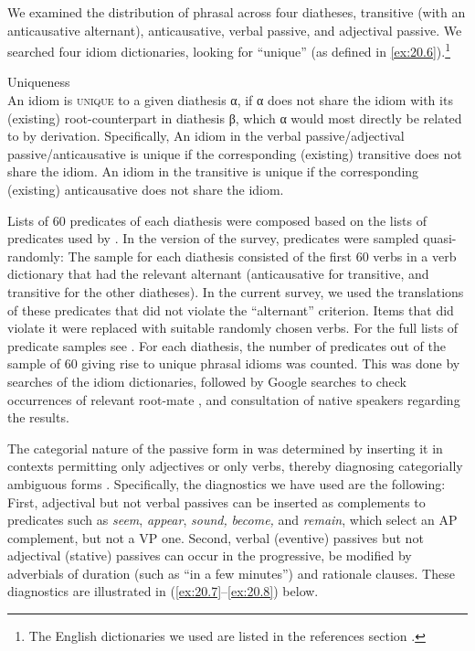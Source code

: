 \documentclass[output=paper]{langsci/langscibook}
\begin{document}
We examined the distribution of phrasal  across four diatheses,
transitive (with an anticausative alternant), anticausative, verbal passive,
and adjectival passive. We searched four  idiom dictionaries,
looking for ``unique''  (as defined in \ref{ex:20.6}).\footnote{The
English dictionaries we used are listed in the references section
\parencite[see][]{Ammer2013,White1998,Heacook2003,Spears2006}.}

\ea\label{ex:20.6} Uniqueness\\
    An idiom is \textsc{unique} to a given diathesis α, if α does not share the idiom
    with its (existing) root-counterpart in diathesis β, which α would most
    directly be related to by derivation.  Specifically,
    \ea An idiom in the verbal passive\slash adjectival passive\slash anticausative is
    unique if the corresponding (existing) transitive does not share the idiom.
    \ex An idiom in the transitive is unique if the corresponding (existing)
    anticausative does not share the idiom.
    \z
\z

Lists of 60 predicates of each diathesis were composed based on the lists of
predicates used by \citet{HorSil2009}. In the  version of
the survey, predicates were sampled quasi-randomly: The sample for each
diathesis consisted of the first 60 verbs in a verb dictionary that had the
relevant alternant (anticausative for transitive, and transitive for the other
diatheses). In the current survey, we used the  translations of
these predicates that did not violate the ``alternant'' criterion. Items that
did violate it were replaced with suitable randomly chosen  verbs. For
the full lists of predicate samples see . For each diathesis, the
number of predicates out of the sample of 60 giving rise to unique phrasal
idioms was counted. This was done by searches of the idiom dictionaries,
followed by Google searches to check occurrences of relevant root-mate ,
and consultation of native speakers regarding the results.

The categorial nature of the passive form in  was determined by inserting
it in contexts permitting only adjectives or only verbs, thereby diagnosing
categorially ambiguous forms \parencite[see][]{Wasow1977}.  Specifically, the
diagnostics we have used are the following: First, adjectival but not verbal
passives can be inserted as complements to predicates such as \emph{seem},
\emph{appear}, \emph{sound,} \emph{become,} and \emph{remain}, which select an
AP complement, but not a VP one. Second, verbal (eventive) passives but not
adjectival (stative) passives can occur in the progressive, be modified by
adverbials of duration (such as ``in a few minutes'') and rationale clauses.
These diagnostics are illustrated in (\ref{ex:20.7}--\ref{ex:20.8}) below.
\end{document}

